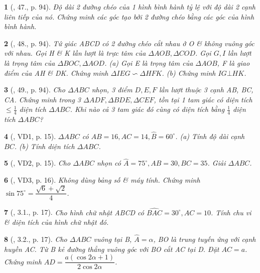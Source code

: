 \documentclass{article}
\newtheorem{baitoan}{}
\begin{document}
\begin{baitoan}[\cite{Binh_Toan_9_tap_1}, 47., p. 94]
	Độ dài 2 đường chéo của 1 hình bình hành tỷ lệ với độ dài 2 cạnh liên tiếp của nó. Chứng minh các góc tạo bởi 2 đường chéo bằng các góc của hình bình hành.
\end{baitoan}

\begin{baitoan}[\cite{Binh_Toan_9_tap_1}, 48., p. 94]
	Tứ giác ABCD có 2 đường chéo cắt nhau ở O \& không vuông góc với nhau. Gọi H \& K lần lượt là trực tâm của $\Delta AOB,\Delta COD$. Gọi $G,I$ lần lượt là trọng tâm của $\Delta BOC,\Delta AOD$. (a) Gọi E là trọng tâm của $\Delta AOB$, F là giao điểm của AH \& DK. Chứng minh $\Delta IEG\backsim\Delta HFK$. (b) Chứng minh $IG\bot HK$.
\end{baitoan}

\begin{baitoan}[\cite{Binh_Toan_9_tap_1}, 49., p. 94]
	Cho $\Delta ABC$ nhọn, 3 điểm $D,E,F$ lần lượt thuộc 3 cạnh AB, BC, CA. Chứng minh trong 3 $\Delta ADF,\Delta BDE,\Delta CEF$, tồn tại 1 tam giác có diện tích $\le\frac{1}{4}$ diện tích $\Delta ABC$. Khi nào cả 3 tam giác đó cùng có diện tích bằng $\frac{1}{4}$ diện tích $\Delta ABC$?
\end{baitoan}

\begin{baitoan}[\cite{TLCT_THCS_Toan_9_hinh_hoc}, VD1, p. 15]
	$\Delta ABC$ có $AB = 16,AC = 14,\widehat{B} = 60^\circ$. (a) Tính độ dài cạnh $BC$. (b) Tính diện tích $\Delta ABC$.
\end{baitoan}

\begin{baitoan}[\cite{TLCT_THCS_Toan_9_hinh_hoc}, VD2, p. 15]
	Cho $\Delta ABC$ nhọn có $\widehat{A} = 75^\circ,AB = 30,BC = 35$. Giải $\Delta ABC$.
\end{baitoan}

\begin{baitoan}[\cite{TLCT_THCS_Toan_9_hinh_hoc}, VD3, p. 16]
	Không dùng bảng số \& máy tính. Chứng minh $\sin75^\circ = \dfrac{\sqrt{6} + \sqrt{2}}{4}$.
\end{baitoan}

\begin{baitoan}[\cite{TLCT_THCS_Toan_9_hinh_hoc}, 3.1., p. 17]
	Cho hình chữ nhật ABCD có $\widehat{BAC} = 30^\circ,AC = 10$. Tính chu vi \& diện tích của hình chữ nhật đó.
\end{baitoan}

\begin{baitoan}[\cite{TLCT_THCS_Toan_9_hinh_hoc}, 3.2., p. 17]
	Cho $\Delta ABC$ vuông tại B, $\widehat{A} = \alpha$, BO là trung tuyến ứng với cạnh huyền AC. Từ B kẻ đường thẳng vuông góc với BO cắt AC tại D. Đặt $AC = a$. Chứng minh $AD = \dfrac{a(\cos2\alpha + 1)}{2\cos2\alpha}$.
\end{baitoan}
\end{document}
